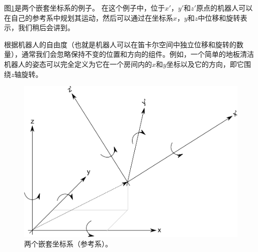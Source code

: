 
图\ref{fig:nestedcoords}是两个嵌套坐标系的例子。 在这个例子中，位于$x'$，$y'$和$z'$原点的机器人可以在自己的参考系中规划其运动，然后可以通过在坐标系$x$，$y$和$z$中位移和旋转表示，我们稍后会讲到。


根据机器人的自由度（也就是机器人可以在笛卡尔空间中独立位移和旋转的数量），通常我们会忽略保持不变的位置和方向的组件。例如，一个简单的地板清洁机器人的姿态可以完全定义为它在一个房间内的$ x $和$ y $坐标以及它的方向，即它围绕$ z $轴旋转。

\begin{figure}
	\centering
		\includegraphics[width=\textwidth]{figs/frameofreference.png}
	\caption{两个嵌套坐标系（参考系）。}
	\label{fig:nestedcoords}
\end{figure}

